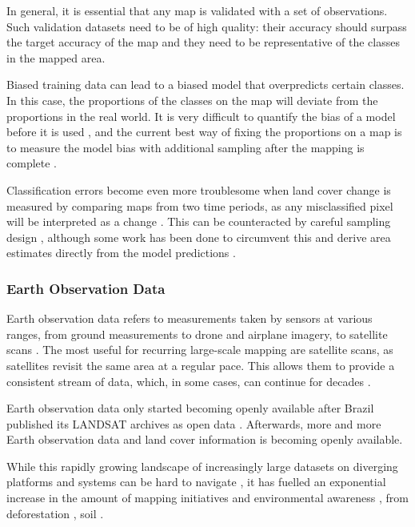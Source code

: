         In general, it is essential that any map is validated with a set of observations. Such validation datasets need to be of high quality: their accuracy should surpass the target accuracy of the map and they need to be representative of the classes in the mapped area.
    
        Biased training data can lead to a biased model that overpredicts certain classes. In this case, the proportions of the classes on the map will deviate from the proportions in the real world. It is very difficult to quantify the bias of a model before it is used \citep{stehman2013estimating}, and the current best way of fixing the proportions on a map is to measure the model bias with additional sampling after the mapping is complete \citep{stehman2014estimating}.

        Classification errors become even more troublesome when land cover change is measured by comparing maps from two time periods, as any misclassified pixel will be interpreted as a change \citep{olofsson2013making}. This can be counteracted by careful sampling design \citep{stehman2012impact,olofsson2014good}, although some work has been done to circumvent this and derive area estimates directly from the model predictions \citep{sales2022land}.

    \subsubsection*{Earth Observation Data}

        Earth observation data refers to measurements taken by sensors at various ranges, from ground measurements \citep{shahi2015novel} to drone \citep{tang2015precise} and airplane \citep{mastelic2020aerial} imagery, to satellite scans \citep{phiri2020sentinel}. The most useful for recurring large-scale mapping are satellite scans, as satellites revisit the same area at a regular pace. This allows them to provide a consistent stream of data, which, in some cases, can continue for decades \citep{xiong2020modis,wulder2022fifty}.

        Earth observation data only started becoming openly available after Brazil published its LANDSAT archives as open data \citep{nature2008markets}. Afterwards, more and more Earth observation data and land cover information is becoming openly available. 
    
        While this rapidly growing landscape of increasingly large datasets on diverging platforms and systems can be hard to navigate \citep{wagemann2021a}, it has fuelled an exponential increase in the amount of mapping initiatives and environmental awareness \citep{wulder2022fifty}, from deforestation \citep{hansen2013high}, soil \citep{hengl2017soilgrids250m}.
    
